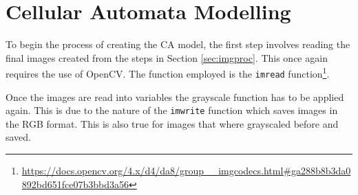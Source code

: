\section{Cellular Automata Modelling}
To begin the process of creating the CA model, the first step involves reading the final images created from the steps in Section \ref{sec:imgproc}. This once again requires the use of OpenCV. The function employed is the \texttt{imread} function\footnote{\url{https://docs.opencv.org/4.x/d4/da8/group__imgcodecs.html\#ga288b8b3da0892bd651fce07b3bbd3a56}}.

Once the images are read into variables the grayscale function has to be applied again. This is due to the nature of the \texttt{imwrite} function which saves images in the RGB format. This is also true for images that where grayscaled before and saved.

